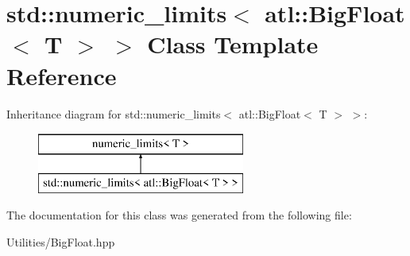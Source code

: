 \hypertarget{classstd_1_1numeric__limits_3_01atl_1_1_big_float_3_01_t_01_4_01_4}{\section{std\+:\+:numeric\+\_\+limits$<$ atl\+:\+:Big\+Float$<$ T $>$ $>$ Class Template Reference}
\label{classstd_1_1numeric__limits_3_01atl_1_1_big_float_3_01_t_01_4_01_4}
}
Inheritance diagram for std\+:\+:numeric\+\_\+limits$<$ atl\+:\+:Big\+Float$<$ T $>$ $>$\+:\begin{figure}[H]
\begin{center}
\leavevmode
\includegraphics[height=2.000000cm]{classstd_1_1numeric__limits_3_01atl_1_1_big_float_3_01_t_01_4_01_4}
\end{center}
\end{figure}


The documentation for this class was generated from the following file\+:\begin{DoxyCompactItemize}
\item 
Utilities/Big\+Float.\+hpp\end{DoxyCompactItemize}
